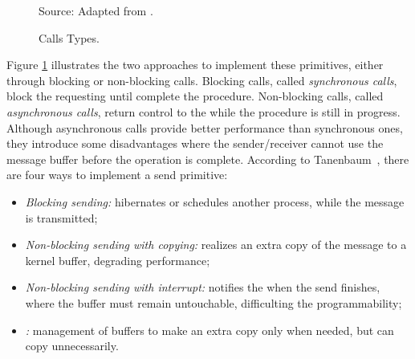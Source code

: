 				\begin{figure}[t]
					\centering
					\caption{Calls Types.}%



					Source: Adapted from \cite{tanenbaum:4ed}.

					\label{fig.calls-types}
				\end{figure}

				Figure \ref{fig.calls-types} illustrates the two approaches to implement
				these primitives, either through blocking or non-blocking calls.
				Blocking calls, called \textit{synchronous calls}, block the requesting \cpu
				until complete the procedure.
				Non-blocking calls, called \textit{asynchronous calls}, return control to the
				\cpu while the procedure is still in progress.
				Although asynchronous calls provide better performance than
				synchronous ones, they introduce some disadvantages where the sender/receiver
				cannot use the message buffer before the operation is complete.
				According to Tanenbaum~\cite{tanenbaum:4ed}, there are four ways to implement
				a send primitive:
				\begin{itemize}
					\item \textit{Blocking sending:} \cpu hibernates or schedules another
						process, while the message is transmitted;
					\item \textit{Non-blocking sending with copying:} realizes an extra copy of
						the message to a kernel buffer, degrading performance;
					\item \textit{Non-blocking sending with interrupt:} notifies the \cpu
						when the send finishes, where the buffer must remain untouchable,
						difficulting the programmability;
					\item \textit{\cow:} management of buffers to make an extra copy only
						when needed, but can copy unnecessarily.
				\end{itemize}

